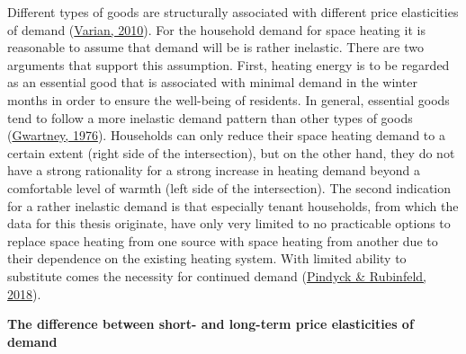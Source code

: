\documentclass[12pt,twoside]{reedthesis}
\begin{document}
Different types of goods are structurally associated with different price elasticities of demand (\protect\hyperlink{ref-varian10}{Varian, 2010}). For the household demand for space heating it is reasonable to assume that demand will be is rather inelastic. There are two arguments that support this assumption. First, heating energy is to be regarded as an essential good that is associated with minimal demand in the winter months in order to ensure the well-being of residents. In general, essential goods tend to follow a more inelastic demand pattern than other types of goods (\protect\hyperlink{ref-gwartney76}{Gwartney, 1976}). Households can only reduce their space heating demand to a certain extent (right side of the intersection), but on the other hand, they do not have a strong rationality for a strong increase in heating demand beyond a comfortable level of warmth (left side of the intersection). The second indication for a rather inelastic demand is that especially tenant households, from which the data for this thesis originate, have only very limited to no practicable options to replace space heating from one source with space heating from another due to their dependence on the existing heating system. With limited ability to substitute comes the necessity for continued demand (\protect\hyperlink{ref-pindyck_rubinfeld18}{Pindyck \& Rubinfeld, 2018}).

\textbf{The difference between short- and long-term price elasticities of demand}
\end{document}
